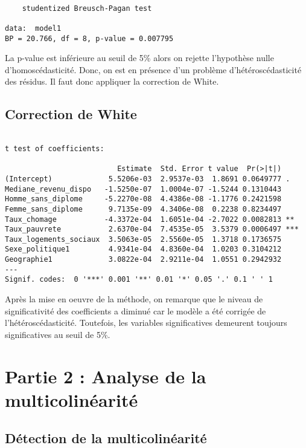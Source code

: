 \documentclass[
]{article}
\begin{document}
\begin{verbatim}

    studentized Breusch-Pagan test

data:  model1
BP = 20.766, df = 8, p-value = 0.007795
\end{verbatim}

La p-value est inférieure au seuil de 5\% alors on rejette l'hypothèse
nulle d'homoscédasticité. Donc, on est en présence d'un problème
d'hétéroscédasticité des résidus. Il faut donc appliquer la correction
de White.

\hypertarget{correction-de-white}{%
\subsection{Correction de White}\label{correction-de-white}}

\begin{verbatim}

t test of coefficients:

                          Estimate  Std. Error t value  Pr(>|t|)    
(Intercept)             5.5206e-03  2.9537e-03  1.8691 0.0649777 .  
Mediane_revenu_dispo   -1.5250e-07  1.0004e-07 -1.5244 0.1310443    
Homme_sans_diplome     -5.2270e-08  4.4386e-08 -1.1776 0.2421598    
Femme_sans_diplome      9.7135e-09  4.3406e-08  0.2238 0.8234497    
Taux_chomage           -4.3372e-04  1.6051e-04 -2.7022 0.0082813 ** 
Taux_pauvrete           2.6370e-04  7.4535e-05  3.5379 0.0006497 ***
Taux_logements_sociaux  3.5063e-05  2.5560e-05  1.3718 0.1736575    
Sexe_politique1         4.9341e-04  4.8360e-04  1.0203 0.3104212    
Geographie1             3.0822e-04  2.9211e-04  1.0551 0.2942932    
---
Signif. codes:  0 '***' 0.001 '**' 0.01 '*' 0.05 '.' 0.1 ' ' 1
\end{verbatim}

Après la mise en oeuvre de la méthode, on remarque que le niveau de
significativité des coefficients a diminué car le modèle a été corrigée
de l'hétéroscédasticité. Toutefois, les variables significatives
demeurent toujours significatives au seuil de 5\%.

\hypertarget{partie-2-analyse-de-la-multicolinuxe9arituxe9}{%
\section{Partie 2 : Analyse de la
multicolinéarité}\label{partie-2-analyse-de-la-multicolinuxe9arituxe9}}

\hypertarget{duxe9tection-de-la-multicolinuxe9arituxe9}{%
\subsection{Détection de la
multicolinéarité}\label{duxe9tection-de-la-multicolinuxe9arituxe9}}
\end{document}
